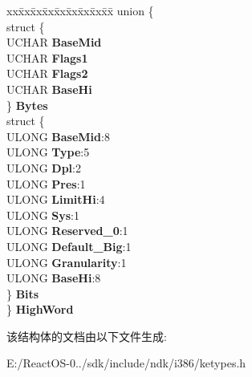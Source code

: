 \begin{DoxyCompactItemize}
\begin{tabbing}
\end{tabbing}\item 
\mbox{\label{struct___k_g_d_t_e_n_t_r_y_a87fd1bf34c52c7b3390521ea3b22be6d}} 
\begin{tabbing}
xx\=xx\=xx\=xx\=xx\=xx\=xx\=xx\=xx\=\kill
union \{\\
\>struct \{\\
\>\>UCHAR {\bfseries BaseMid}\\
\>\>UCHAR {\bfseries Flags1}\\
\>\>UCHAR {\bfseries Flags2}\\
\>\>UCHAR {\bfseries BaseHi}\\
\>\} {\bfseries Bytes}\\
\>struct \{\\
\>\>ULONG {\bfseries BaseMid}:8\\
\>\>ULONG {\bfseries Type}:5\\
\>\>ULONG {\bfseries Dpl}:2\\
\>\>ULONG {\bfseries Pres}:1\\
\>\>ULONG {\bfseries LimitHi}:4\\
\>\>ULONG {\bfseries Sys}:1\\
\>\>ULONG {\bfseries Reserved\_0}:1\\
\>\>ULONG {\bfseries Default\_Big}:1\\
\>\>ULONG {\bfseries Granularity}:1\\
\>\>ULONG {\bfseries BaseHi}:8\\
\>\} {\bfseries Bits}\\
\} {\bfseries HighWord}\\

\end{tabbing}\end{DoxyCompactItemize}


该结构体的文档由以下文件生成\+:\begin{DoxyCompactItemize}
\item 
E\+:/\+React\+O\+S-\/0../sdk/include/ndk/i386/ketypes.\+h\end{DoxyCompactItemize}
